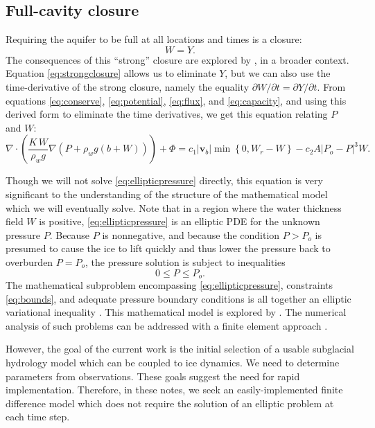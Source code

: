 \documentclass[12pt,final]{amsart}%
\newcommand\bv{\mathbf{v}}
\newcommand{\Div}{\nabla\cdot}
\newcommand{\grad}{\nabla}
\begin{document}
\subsection*{Full-cavity closure}  Requiring the aquifer to be full at all locations and times is a closure:
\begin{equation}
W = Y.\label{eq:strongclosure}
\end{equation}
The consequences of this ``strong'' closure are explored by \cite{Schoofetal2012}, in a broader context.  Equation \eqref{eq:strongclosure} allows us to eliminate $Y$, but we can also use the time-derivative of the strong closure, namely the equality $\partial W/\partial t = \partial Y/\partial t$.  From equations \eqref{eq:conserve}, \eqref{eq:potential}, \eqref{eq:flux}, and \eqref{eq:capacity}, and using this derived form to eliminate the time derivatives, we get this equation relating $P$ and $W$:
\begin{equation}
\Div \left(\frac{K\,W}{\rho_w g} \grad \left(P + \rho_w g (b+W)\right) \right) + \Phi = c_1 |\bv_b| \min\left\{0,W_r - W\right\} - c_2 A |P_o - P|^3 W.\label{eq:ellipticpressure}
\end{equation}

Though we will not solve \eqref{eq:ellipticpressure} directly, this equation is very significant to the understanding of the structure of the mathematical model which we will eventually solve.  Note that in a region where the water thickness field $W$ is positive, \eqref{eq:ellipticpressure} is an elliptic PDE for the unknown pressure $P$.  Because $P$ is nonnegative, and because the condition $P>P_o$ is presumed to cause the ice to lift quickly and thus lower the pressure back to overburden $P=P_o$, the pressure solution is subject to inequalities
\begin{equation}
0 \le P \le P_o. \label{eq:bounds}
\end{equation}
The mathematical subproblem encompassing \eqref{eq:ellipticpressure}, constraints \eqref{eq:bounds}, and adequate pressure boundary conditions is all together an elliptic variational inequality \citep{KinderlehrerStampacchia}.  This mathematical model is explored by \cite{Schoofetal2012}.  The numerical analysis of such problems can be addressed with a finite element approach \citep{SchoofStream,JouvetBueler2012}.

However, the goal of the current work is the initial selection of a usable subglacial hydrology model which can be coupled to ice dynamics.  We need to determine parameters from observations.  These goals suggest the need for rapid implementation.  Therefore, in these notes, we seek an easily-implemented finite difference model which does not require the solution of an elliptic problem at each time step.
\end{document}
